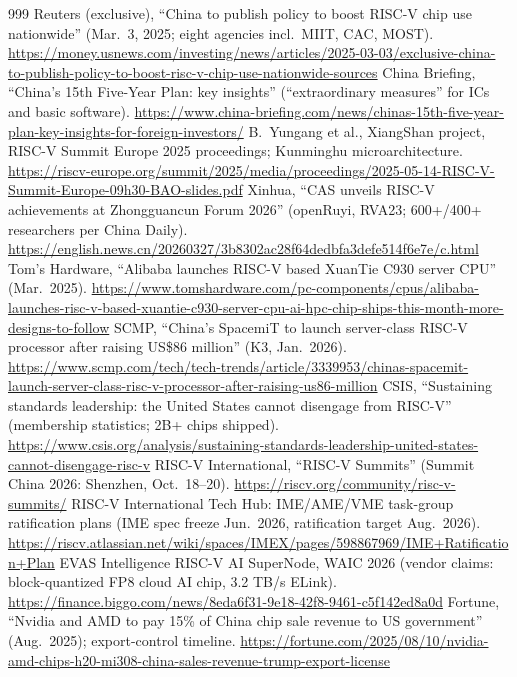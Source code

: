 \begin{thebibliography}{999}
 Reuters (exclusive), ``China to publish policy to boost RISC-V chip use nationwide'' (Mar.\ 3, 2025; eight agencies incl.\ MIIT, CAC, MOST). \url{https://money.usnews.com/investing/news/articles/2025-03-03/exclusive-china-to-publish-policy-to-boost-risc-v-chip-use-nationwide-sources}
 China Briefing, ``China's 15th Five-Year Plan: key insights'' (``extraordinary measures'' for ICs and basic software). \url{https://www.china-briefing.com/news/chinas-15th-five-year-plan-key-insights-for-foreign-investors/}
 B.~Yungang et al., XiangShan project, RISC-V Summit Europe 2025 proceedings; Kunminghu microarchitecture. \url{https://riscv-europe.org/summit/2025/media/proceedings/2025-05-14-RISC-V-Summit-Europe-09h30-BAO-slides.pdf}
 Xinhua, ``CAS unveils RISC-V achievements at Zhongguancun Forum 2026'' (openRuyi, RVA23; 600+/400+ researchers per China Daily). \url{https://english.news.cn/20260327/3b8302ac28f64dedbfa3defe514f6e7e/c.html}
 Tom's Hardware, ``Alibaba launches RISC-V based XuanTie C930 server CPU'' (Mar.\ 2025). \url{https://www.tomshardware.com/pc-components/cpus/alibaba-launches-risc-v-based-xuantie-c930-server-cpu-ai-hpc-chip-ships-this-month-more-designs-to-follow}
 SCMP, ``China's SpacemiT to launch server-class RISC-V processor after raising US\$86 million'' (K3, Jan.\ 2026). \url{https://www.scmp.com/tech/tech-trends/article/3339953/chinas-spacemit-launch-server-class-risc-v-processor-after-raising-us86-million}
 CSIS, ``Sustaining standards leadership: the United States cannot disengage from RISC-V'' (membership statistics; 2B+ chips shipped). \url{https://www.csis.org/analysis/sustaining-standards-leadership-united-states-cannot-disengage-risc-v}
 RISC-V International, ``RISC-V Summits'' (Summit China 2026: Shenzhen, Oct.\ 18--20). \url{https://riscv.org/community/risc-v-summits/}
 RISC-V International Tech Hub: IME/AME/VME task-group ratification plans (IME spec freeze Jun.\ 2026, ratification target Aug.\ 2026). \url{https://riscv.atlassian.net/wiki/spaces/IMEX/pages/598867969/IME+Ratification+Plan}
 EVAS Intelligence RISC-V AI SuperNode, WAIC 2026 (vendor claims: block-quantized FP8 cloud AI chip, 3.2 TB/s ELink). \url{https://finance.biggo.com/news/8eda6f31-9e18-42f8-9461-c5f142ed8a0d}
 Fortune, ``Nvidia and AMD to pay 15\% of China chip sale revenue to US government'' (Aug.\ 2025); export-control timeline. \url{https://fortune.com/2025/08/10/nvidia-amd-chips-h20-mi308-china-sales-revenue-trump-export-license}

\end{thebibliography}
